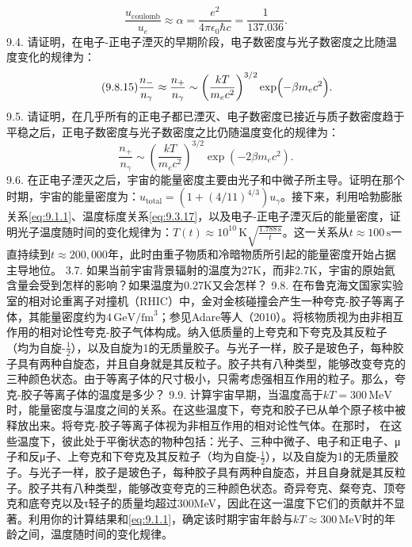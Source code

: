 \begin{equation}\tag{9.8.14}\label{eq:9.8.14}
\frac { u _ { \mathrm { c o u l o m b } } } { u _ { e } } \approx \alpha = \frac { e ^{2} } { 4 \pi \epsilon _ { 0 } \hbar c } = \frac { 1 } { 13 7 . 03 6 } .
\end{equation}
9.4. 请证明，在电子-正电子湮灭的早期阶段，电子数密度与光子数密度之比随温度变化的规律为：
\begin{equation}\tag{9.8.15}\label{eq:9.8.15}
\frac { n _ { - } } { n _ { \gamma } } \approx \frac { n _ { + } } { n _ { \gamma } } \sim \left( \frac { k T } { m _ { e } c ^{2} } \right) ^{3 / 2} \exp \Bigl ( - \beta m _ { e } c ^{2} \Bigr ) .
\end{equation}
9.5. 请证明，在几乎所有的正电子都已湮灭、电子数密度已接近与质子数密度趋于平稳之后，正电子数密度与光子数密度之比仍随温度变化的规律为：
\begin{equation}\tag{9.8.16}\label{eq:9.8.16}
\frac { n _ { + } } { n _ { \gamma } } \sim \left( \frac { k T } { m _ { e } c ^{2} } \right) ^{3 / 2} \exp  \left( - 2 \beta m _ { e } c ^{2} \right) .
\end{equation}
9.6. 在正电子湮灭之后，宇宙的能量密度主要由光子和中微子所主导。证明在那个时期，宇宙的能量密度为：\(u_{\mathrm{total}}=(1+(4/11)^{4/3})u_{\gamma}\)。接下来，利用哈勃膨胀关系\autoref{eq:9.1.1}、温度标度关系\autoref{eq:9.3.17}，以及电子-正电子湮灭后的能量密度，证明光子温度随时间的变化规律为：\(T(t)\approx10^{10}\,\mathrm{K}\sqrt{\frac{1.788\,\mathrm{s}}{t}}\)。这一关系从\(t\approx100\,\mathrm{s}\)一直持续到\(t\approx200,000\)年，此时由重子物质和冷暗物质所引起的能量密度开始占据主导地位。
3.7. 如果当前宇宙背景辐射的温度为27K，而非2.7K，宇宙的原始氦含量会受到怎样的影响？如果温度为0.27K又会怎样？
9.8. 在布鲁克海文国家实验室的相对论重离子对撞机（RHIC）中，金对金核碰撞会产生一种夸克-胶子等离子体，其能量密度约为\(4\,\mathrm{GeV}/\mathrm{fm}^3\)；参见Adare等人（2010）。将核物质视为由非相互作用的相对论性夸克-胶子气体构成。纳入低质量的上夸克和下夸克及其反粒子（均为自旋-\(\frac{1}{2}\)），以及自旋为1的无质量胶子。与光子一样，胶子是玻色子，每种胶子具有两种自旋态，并且自身就是其反粒子。胶子共有八种类型，能够改变夸克的三种颜色状态。由于等离子体的尺寸极小，只需考虑强相互作用的粒子。那么，夸克-胶子等离子体的温度是多少？
9.9. 计算宇宙早期，当温度高于\(kT = 300\,\mathrm{MeV}\)时，能量密度与温度之间的关系。在这些温度下，夸克和胶子已从单个原子核中被释放出来。将夸克-胶子等离子体视为非相互作用的相对论性气体。在那时，
在这些温度下，彼此处于平衡状态的物种包括：光子、三种中微子、电子和正电子、μ子和反μ子、上夸克和下夸克及其反粒子（均为自旋-\(\frac{1}{2}\)），以及自旋为1的无质量胶子。与光子一样，胶子是玻色子，每种胶子具有两种自旋态，并且自身就是其反粒子。胶子共有八种类型，能够改变夸克的三种颜色状态。奇异夸克、粲夸克、顶夸克和底夸克以及τ轻子的质量均超过300MeV，因此在这一温度下它们的贡献并不显著。利用你的计算结果和\autoref{eq:9.1.1}，确定该时期宇宙年龄与\(kT \approx 300\,\mathrm{MeV}\)时的年龄之间，温度随时间的变化规律。


